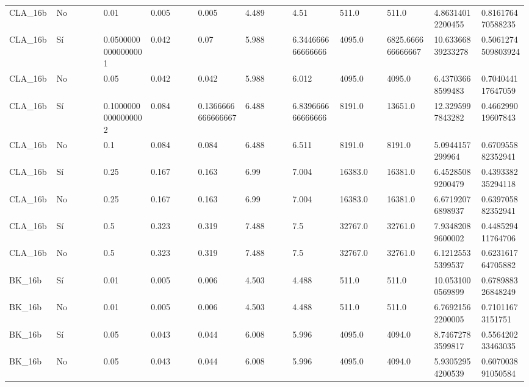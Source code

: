 {{\begin{longtable}{M{0.09\linewidth}M{0.09\linewidth}M{0.09\linewidth}M{0.09\linewidth}M{0.09\linewidth}M{0.09\linewidth}M{0.09\linewidth}M{0.09\linewidth}M{0.09\linewidth}M{0.09\linewidth}M{0.09\linewidth}}
CLA\_16b & No & \num{0.01} & \num{0.005} & \num{0.005} & \num{4.489} & \num{4.51} & \num{511.0} & \num{511.0} & \num{4.86314012200455} & \num{0.816176470588235} \\
CLA\_16b & Sí & \num{0.05000000000000001} & \num{0.042} & \num{0.07} & \num{5.988} & \num{6.344666666666666} & \num{4095.0} & \num{6825.666666666667} & \num{10.63366839233278} & \num{0.5061274509803924} \\
CLA\_16b & No & \num{0.05} & \num{0.042} & \num{0.042} & \num{5.988} & \num{6.012} & \num{4095.0} & \num{4095.0} & \num{6.43703668599483} & \num{0.704044117647059} \\
CLA\_16b & Sí & \num{0.10000000000000002} & \num{0.084} & \num{0.1366666666666667} & \num{6.488} & \num{6.839666666666666} & \num{8191.0} & \num{13651.0} & \num{12.3295997843282} & \num{0.466299019607843} \\
CLA\_16b & No & \num{0.1} & \num{0.084} & \num{0.084} & \num{6.488} & \num{6.511} & \num{8191.0} & \num{8191.0} & \num{5.0944157299964} & \num{0.670955882352941} \\
CLA\_16b & Sí & \num{0.25} & \num{0.167} & \num{0.163} & \num{6.99} & \num{7.004} & \num{16383.0} & \num{16381.0} & \num{6.45285089200479} & \num{0.439338235294118} \\
CLA\_16b & No & \num{0.25} & \num{0.167} & \num{0.163} & \num{6.99} & \num{7.004} & \num{16383.0} & \num{16381.0} & \num{6.67192076898937} & \num{0.639705882352941} \\
CLA\_16b & Sí & \num{0.5} & \num{0.323} & \num{0.319} & \num{7.488} & \num{7.5} & \num{32767.0} & \num{32761.0} & \num{7.93482089600002} & \num{0.448529411764706} \\
CLA\_16b & No & \num{0.5} & \num{0.323} & \num{0.319} & \num{7.488} & \num{7.5} & \num{32767.0} & \num{32761.0} & \num{6.12125535399537} & \num{0.623161764705882} \\
BK\_16b & Sí & \num{0.01} & \num{0.005} & \num{0.006} & \num{4.503} & \num{4.488} & \num{511.0} & \num{511.0} & \num{10.0531000569899} & \num{0.678988326848249} \\
BK\_16b & No & \num{0.01} & \num{0.005} & \num{0.006} & \num{4.503} & \num{4.488} & \num{511.0} & \num{511.0} & \num{6.76921562200005} & \num{0.71011673151751} \\
BK\_16b & Sí & \num{0.05} & \num{0.043} & \num{0.044} & \num{6.008} & \num{5.996} & \num{4095.0} & \num{4094.0} & \num{8.74672783599817} & \num{0.556420233463035} \\
BK\_16b & No & \num{0.05} & \num{0.043} & \num{0.044} & \num{6.008} & \num{5.996} & \num{4095.0} & \num{4094.0} & \num{5.93052954200539} & \num{0.607003891050584} \\

\end{longtable}}}
